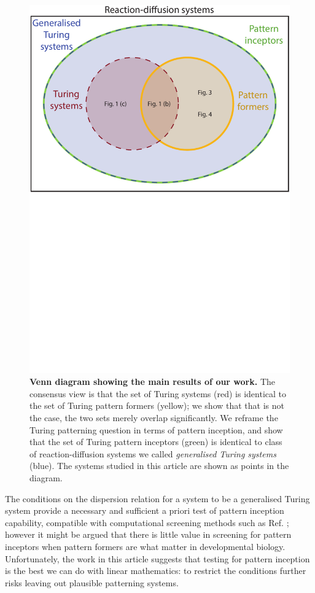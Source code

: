 \begin{figure}[ht]
  \centering
  \includegraphics[width=0.7\linewidth,trim=0cm 14cm 0cm 0cm,clip=true]{Venn}
  \caption{\textbf{Venn diagram showing the main results of our work.} The consensus view is that the set of Turing systems (red) is identical to the set of Turing pattern formers (yellow); we show that that is not the case, the two sets merely overlap significantly. We reframe the Turing patterning question in terms of pattern inception, and show that the set of Turing pattern inceptors (green) is identical to class of reaction-diffusion systems we called \emph{generalised Turing systems} (blue). The systems studied in this article are shown as points in the diagram.}\label{venn}
\end{figure}

The conditions on the dispersion relation for a system to be a generalised Turing system provide a necessary and sufficient a priori test of pattern inception capability, compatible with computational screening methods such as Ref. \cite{marcon2016high}; however it might be argued that there is little value in screening for pattern inceptors when pattern formers are what matter in developmental biology. 
Unfortunately, the work in this article suggests that testing for pattern inception is the best we can do with linear mathematics: to restrict the conditions further risks leaving out plausible patterning systems.

